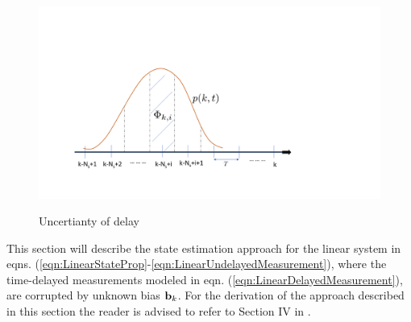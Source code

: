 \begin{figure}
	{\includegraphics[trim={2.0cm 2.5cm 6.0cm 6.0cm},clip, width=\columnwidth]{./img/delay_uncertainty.png}}
	\caption{Uncertianty of delay}
	\label{fig:delay_uncertainty}
\end{figure}

This section will describe the state estimation approach for the linear system in eqns. (\ref{eqn:LinearStateProp}-\ref{eqn:LinearUndelayedMeasurement}), where the time-delayed measurements modeled in eqn. (\ref{eqn:LinearDelayedMeasurement}),  are corrupted by unknown bias $\mathbf{b}_k$. 
For the derivation of the approach described in this section the reader is advised to refer to \red Section IV in \cite{choi2012state}.\black


